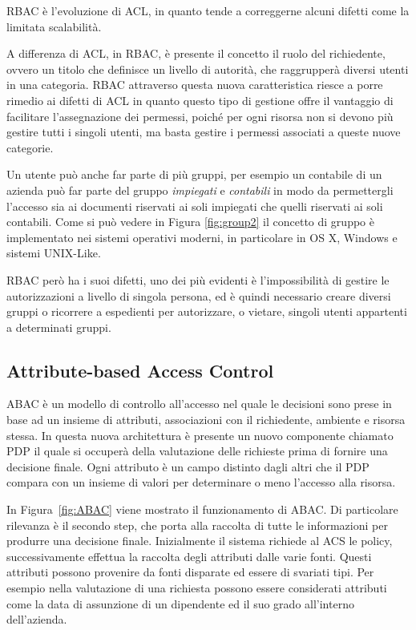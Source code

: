 \ac{RBAC} è l'evoluzione di \ac{ACL}, in quanto tende a correggerne alcuni difetti come la limitata scalabilità. \par
A differenza di \ac{ACL}, in \ac{RBAC}, è presente il concetto il ruolo del richiedente, ovvero un titolo che definisce un livello di autorità, che raggrupperà diversi utenti in una categoria. 
\ac{RBAC} attraverso questa nuova caratteristica riesce a porre rimedio ai difetti di \ac{ACL} in quanto
questo tipo di gestione offre il vantaggio di facilitare l'assegnazione dei permessi, poiché per ogni risorsa non si devono più gestire tutti i singoli utenti, ma basta gestire i permessi associati a queste nuove categorie. 


Un utente può anche far parte di più gruppi, per esempio un contabile di un azienda può far parte del gruppo \textit{impiegati} e \textit{contabili} in modo da permettergli l'accesso sia ai documenti riservati ai soli impiegati che quelli riservati ai soli contabili.
Come si può vedere in Figura \ref{fig:group2} il concetto di gruppo è implementato nei sistemi operativi moderni, in particolare in OS X, Windows e sistemi UNIX-Like.

\ac{RBAC} però ha i suoi difetti, uno dei più evidenti è l'impossibilità di gestire le autorizzazioni a livello di singola persona, ed è quindi necessario creare diversi gruppi o ricorrere a espedienti per autorizzare, o vietare, singoli utenti appartenti a determinati gruppi.


\subsection*{Attribute-based Access Control } %
\label{sub:attribute_based_access_control_}

\ac{ABAC} è un modello di controllo all'accesso  nel quale le decisioni sono prese in base ad un insieme 
di attributi, associazioni con il richiedente, ambiente e risorsa stessa.
In questa nuova architettura è presente un nuovo componente chiamato \ac{PDP} il quale si occuperà della valutazione delle richieste prima di fornire una decisione finale.
Ogni attributo è un campo distinto dagli altri che il \ac{PDP} compara con un insieme di valori per determinare o meno l'accesso alla risorsa. 

In Figura~\ref{fig:ABAC} viene mostrato il funzionamento di \ac{ABAC}. Di particolare rilevanza è il secondo step, che porta alla raccolta di tutte le informazioni per produrre una decisione finale.
Inizialmente il sistema richiede al \ac{ACS} le policy, successivamente effettua la raccolta degli attributi dalle varie fonti.
Questi attributi possono provenire da fonti disparate ed essere di svariati tipi. Per esempio nella valutazione di una richiesta possono essere considerati attributi come la data di assunzione di un dipendente ed il suo grado all'interno dell'azienda. 


